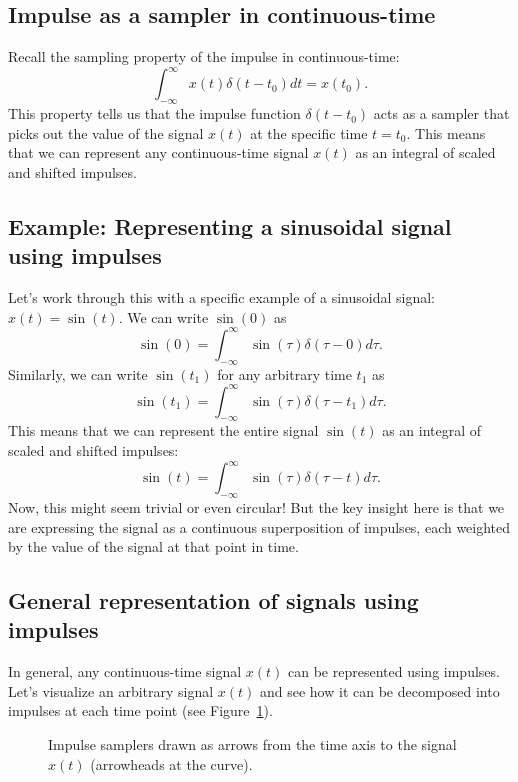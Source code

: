 \documentclass{ee102_notes}
\begin{document}
\subsection{Impulse as a sampler in continuous-time}
Recall the sampling property of the impulse in continuous-time:
\[
\int_{-\infty}^{\infty} x(t) \delta(t - t_0) dt = x(t_0).
\]
This property tells us that the impulse function $\delta(t - t_0)$ acts as a sampler that picks out the value of the signal $x(t)$ at the specific time $t = t_0$. This means that we can represent any continuous-time signal $x(t)$ as an integral of scaled and shifted impulses. 
\subsection{Example: Representing a sinusoidal signal using impulses}
Let's work through this with a specific example of a sinusoidal signal: $x(t) = \sin(t)$. We can write $\sin(0)$ as
\[
\sin(0) = \int_{-\infty}^{\infty} \sin(\tau) \delta(\tau - 0) d\tau.
\]
Similarly, we can write $\sin(t_1)$ for any arbitrary time $t_1$ as
\[
\sin(t_1) = \int_{-\infty}^{\infty} \sin(\tau) \delta(\tau - t_1) d\tau.
\]
This means that we can represent the entire signal $\sin(t)$ as an integral of scaled and shifted impulses:
\[
\sin(t) = \int_{-\infty}^{\infty} \sin(\tau) \delta(\tau - t) d\tau.
\]
Now, this might seem trivial or even circular! But the key insight here is that we are expressing the signal as a continuous superposition of impulses, each weighted by the value of the signal at that point in time. 

\subsection{General representation of signals using impulses}
In general, any continuous-time signal $x(t)$ can be represented using impulses. Let's visualize an arbitrary signal $x(t)$ and see how it can be decomposed into impulses at each time point (see Figure~\ref{fig:ct-impulse-samplers}).
\begin{figure}[h]
\centering
{}
\caption{Impulse samplers drawn as arrows from the time axis to the signal $x(t)$ (arrowheads at the curve).}
\label{fig:ct-impulse-samplers}
\end{figure}
\end{document}
